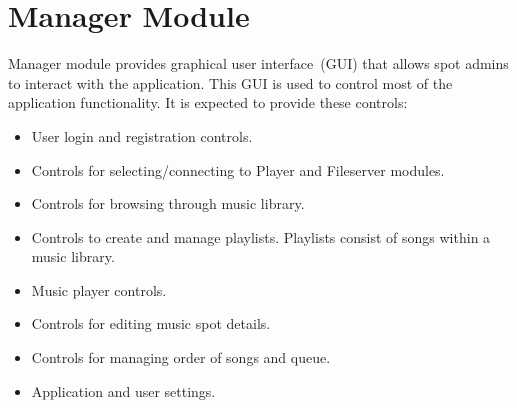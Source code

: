 \section {Manager Module}

Manager module provides graphical user interface~(GUI) that allows spot admins to interact with the application. This GUI is used to control most of the application functionality. It is expected to provide these controls:
\begin{itemize}
    \item User login and registration controls.
    \item Controls for selecting/connecting to Player and Fileserver modules.
    \item Controls for browsing through music library.
    \item Controls to create and manage playlists. Playlists consist of songs within a music library.
    \item Music player controls.
    \item Controls for editing music spot details.
    \item Controls for managing order of songs and queue.
    \item Application and user settings.
\end{itemize}

